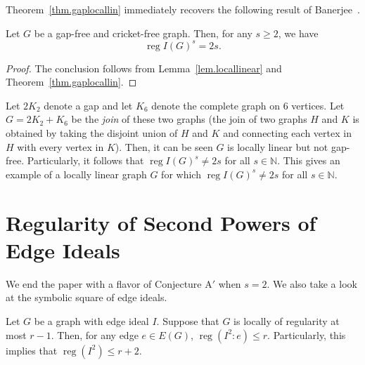\documentclass[ALCO,ThmDefs,Unicode,epreuves]{cedram}
\DeclareMathOperator{\reg}{reg}
\newcommand{\NN}{{\mathbb N}}
\newcommand*{\reg}{\mathrm{reg}}
\begin{document}
Theorem~\ref{thm.gaplocallin} immediately recovers the following result of Banerjee~\cite{Ba}.

\begin{coro} \label{cor.Ba}
Let $G$ be a gap-free and cricket-free graph. Then, for any $s \ge 2$, we have
\[
\reg I(G)^s = 2s.
\]

\end{coro}

\begin{proof} The conclusion follows from Lemma~\ref{lem.locallinear} and Theorem~\ref{thm.gaplocallin}.
\end{proof}

\begin{exam} Let $2K_2$ denote a gap and let $K_6$ denote the complete graph on 6 vertices. Let $G = 2K_2 + K_6$ be the \emph{join} of these two graphs (the join of two graphs $H$ and $K$ is obtained by taking the disjoint union of $H$ and $K$ and connecting each vertex in $H$ with every vertex in $K$). Then, it can be seen $G$ is locally linear but not gap-free. Particularly, it follows that $\reg I(G)^s \not= 2s$ for all $s \in \NN$. This gives an example of a locally linear graph $G$ for which $\reg I(G)^s \not= 2s$ for all $s \in \NN$.
\end{exam}


\section{Regularity of Second Powers of Edge Ideals} \label{chapter5}

We end the paper with a flavor of Conjecture $\text{A}'$ when $s = 2$. We also take a look at the symbolic square of edge ideals.

\begin{theo} \label{thm.square}
Let $G$ be a graph with edge ideal $I$. Suppose that $G$ is locally of regularity at most $r-1$. Then, for any edge $e \in E(G)$, $\reg (I^2:e) \le r.$ Particularly, this implies that $\reg (I^2) \le r+2.$
\end{theo}
\end{document}
